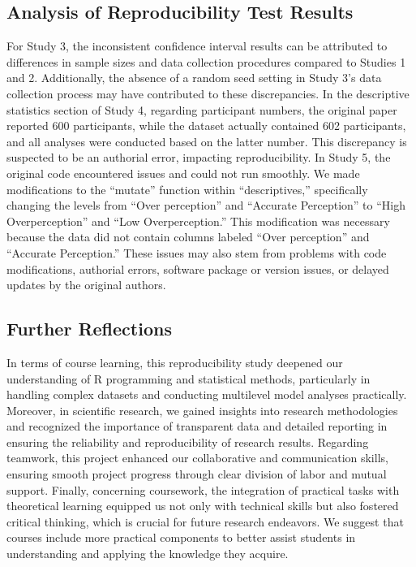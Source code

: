 \documentclass[
  man]{apa6}
\begin{document}
\hypertarget{analysis-of-reproducibility-test-results}{%
\subsection{Analysis of Reproducibility Test Results}\label{analysis-of-reproducibility-test-results}}

For Study 3, the inconsistent confidence interval results can be attributed to differences in sample sizes and data collection procedures compared to Studies 1 and 2. Additionally, the absence of a random seed setting in Study 3's data collection process may have contributed to these discrepancies.
In the descriptive statistics section of Study 4, regarding participant numbers, the original paper reported 600 participants, while the dataset actually contained 602 participants, and all analyses were conducted based on the latter number. This discrepancy is suspected to be an authorial error, impacting reproducibility.
In Study 5, the original code encountered issues and could not run smoothly. We made modifications to the ``mutate'' function within ``descriptives,'' specifically changing the levels from ``Over perception'' and ``Accurate Perception'' to ``High Overperception'' and ``Low Overperception.'' This modification was necessary because the data did not contain columns labeled ``Over perception'' and ``Accurate Perception.''
These issues may also stem from problems with code modifications, authorial errors, software package or version issues, or delayed updates by the original authors.

\hypertarget{further-reflections}{%
\subsection{Further Reflections}\label{further-reflections}}

In terms of course learning, this reproducibility study deepened our understanding of R programming and statistical methods, particularly in handling complex datasets and conducting multilevel model analyses practically. Moreover, in scientific research, we gained insights into research methodologies and recognized the importance of transparent data and detailed reporting in ensuring the reliability and reproducibility of research results. Regarding teamwork, this project enhanced our collaborative and communication skills, ensuring smooth project progress through clear division of labor and mutual support.
Finally, concerning coursework, the integration of practical tasks with theoretical learning equipped us not only with technical skills but also fostered critical thinking, which is crucial for future research endeavors. We suggest that courses include more practical components to better assist students in understanding and applying the knowledge they acquire.
\end{document}
